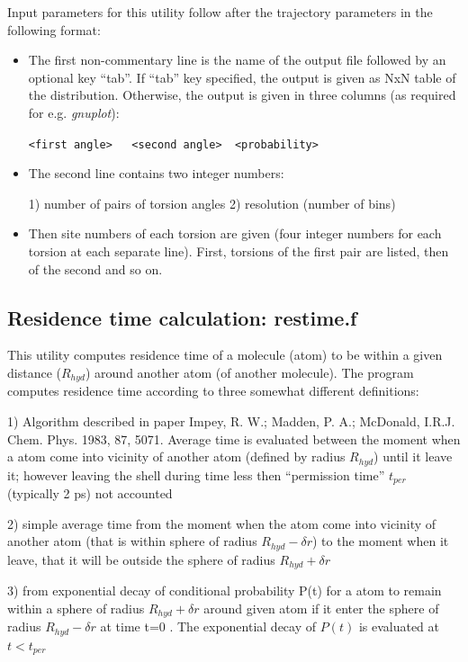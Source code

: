 \documentclass{article}
\begin{document}
Input parameters for this utility follow after the trajectory parameters
in the following format:

\begin{itemize}

\item
The first non-commentary line is the name of the output file followed by
an optional key ``tab''.  If ``tab'' key specified, the output is given as
NxN table of the distribution. Otherwise, the output is given in
three columns (as required for e.g. {\it gnuplot}): 

\verb|<first angle>   <second angle>  <probability>|

\item
The second line contains two integer numbers:

1) number of pairs of torsion angles
2) resolution (number of bins) 

\item
Then site numbers of each torsion are given (four integer numbers 
for each  torsion at each separate line). First, torsions of the
first pair are listed, then of the second and so on.

\end{itemize}


\subsection{Residence time calculation:  restime.f}
This utility computes residence time of a molecule (atom) to be
within a given distance ($R_{hyd}$) around another atom (of another molecule).  
The program computes residence time according to three somewhat 
different definitions: 

1) Algorithm described in paper Impey, R. W.; Madden, P. A.; 
McDonald, I.R.J. Chem. Phys. 1983, 87, 5071.
Average time is evaluated between the moment when a atom come into 
vicinity of another atom (defined by radius $R_{hyd}$) until it leave it;
however leaving the shell during time less then ``permission time'' $t_{per}$
(typically 2 ps) not accounted

2) simple average time from the moment when the atom come into
vicinity of another atom (that is within sphere of radius  $R_{hyd}-\delta r$) 
to the moment when it leave, that it will be outside the sphere of radius 
$R_{hyd}+\delta r$

3) from exponential decay of conditional probability P(t) for a atom to 
remain within a sphere of radius $R_{hyd}+\delta r$ around given atom if 
it enter the sphere of radius $R_{hyd}-\delta r$ at time t=0 . The exponential
decay of $P(t)$ is evaluated at $t < t_{per}$
\end{document}
